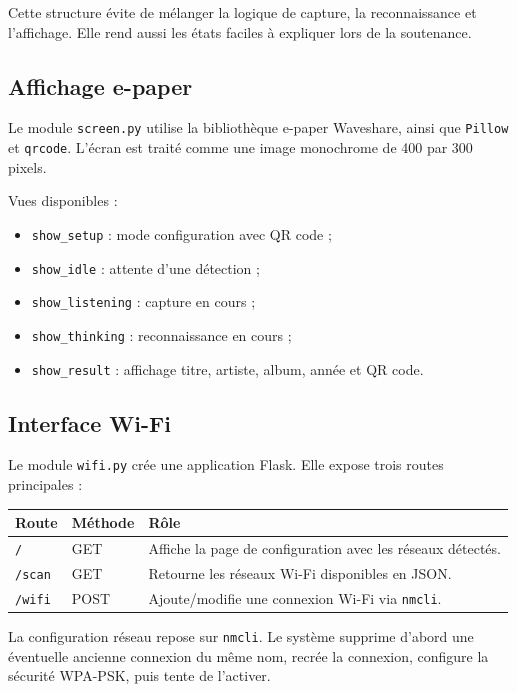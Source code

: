 Cette structure évite de mélanger la logique de capture, la reconnaissance et
l'affichage. Elle rend aussi les états faciles à expliquer lors de la
soutenance.

\subsection{Affichage e-paper}

Le module \texttt{screen.py} utilise la bibliothèque e-paper Waveshare, ainsi
que \texttt{Pillow} et \texttt{qrcode}. L'écran est traité comme une image
monochrome de 400 par 300 pixels.

Vues disponibles :

\begin{itemize}
    \item \texttt{show\_setup} : mode configuration avec QR code ;
    \item \texttt{show\_idle} : attente d'une détection ;
    \item \texttt{show\_listening} : capture en cours ;
    \item \texttt{show\_thinking} : reconnaissance en cours ;
    \item \texttt{show\_result} : affichage titre, artiste, album, année et QR code.
\end{itemize}

\subsection{Interface Wi-Fi}

Le module \texttt{wifi.py} crée une application Flask. Elle expose trois routes
principales :

\begin{longtable}{|p{3cm}|p{3cm}|p{7cm}|}
\hline
\textbf{Route} & \textbf{Méthode} & \textbf{Rôle} \\
\hline
\texttt{/} & GET & Affiche la page de configuration avec les réseaux détectés. \\
\hline
\texttt{/scan} & GET & Retourne les réseaux Wi-Fi disponibles en JSON. \\
\hline
\texttt{/wifi} & POST & Ajoute/modifie une connexion Wi-Fi via \texttt{nmcli}. \\
\hline
\end{longtable}

La configuration réseau repose sur \texttt{nmcli}. Le système supprime
d'abord une éventuelle ancienne connexion du même nom, recrée la connexion,
configure la sécurité WPA-PSK, puis tente de l'activer.


